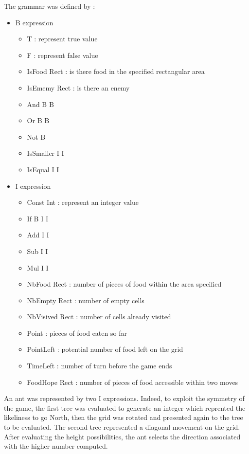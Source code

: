 \documentclass[10pt,a4paper]{article}
\begin{document}
The grammar was defined by :
\begin{itemize}
\item B expression
  \begin{itemize}
    \item T : represent true value 
    \item F : represent false value
    \item IsFood Rect : is there food in the specified rectangular area
    \item IsEmemy Rect : is there an enemy
    \item And B B
    \item Or B B
    \item Not B
    \item IsSmaller I I
    \item IsEqual I I
  \end{itemize}
\item I expression
  \begin{itemize}
  \item Const Int : represent an integer value
  \item If B I I
  \item Add I I
  \item Sub I I
  \item Mul I I
  \item NbFood Rect : number of pieces of food within the area specified
  \item NbEmpty Rect : number of empty cells
  \item NbVisived Rect : number of cells already visited
  \item Point : pieces of food eaten so far
  \item PointLeft : potential number of food left on the grid
  \item TimeLeft : number of turn before the game ends
  \item FoodHope Rect : number of pieces of food accessible within two moves
  \end{itemize}
\end{itemize}

An ant was represented by two I expressions. Indeed, to exploit the
symmetry of the game, the first tree was evaluated to generate an
integer which reprented the likeliness to go North, then the grid was
rotated and presented again to the tree to be evaluated. The second
tree represented a diagonal movement on the grid. After evaluating the
height possibilities, the ant selects the direction associated with
the higher number computed.\\
\end{document}
